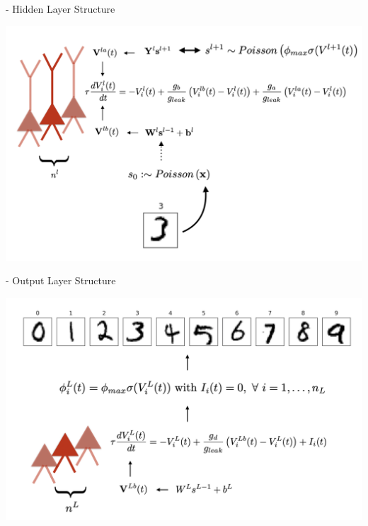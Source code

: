 \documentclass[dvipsnames, usenames]{beamer}
\begin{document}
\begin{frame}[noframenumbering]{\citet{guerguiev2017} - Hidden Layer Structure}

\centering 
\includegraphics[width=1.05\textwidth]{../figures/report/hidden_2}
\end{frame}

\begin{frame}{\citet{guerguiev2017} - Output Layer Structure}

\centering 
\includegraphics[width=1.05\textwidth]{../figures/report/out_1}
\end{frame}
\end{document}
